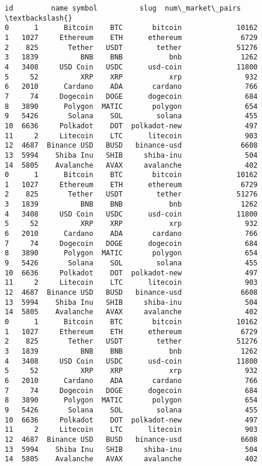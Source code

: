 \documentclass[11pt]{article}
\makeatletter
\newcommand{\boxspacing}{\kern\kvtcb@left@rule\kern\kvtcb@boxsep}
\newcommand{\prompt}[4]{
        {\ttfamily\llap{{\color{#2}[#3]:\hspace{3pt}#4}}\vspace{-\baselineskip}}
    }
\makeatother
\begin{document}
            \begin{tcolorbox}[breakable, size=fbox, boxrule=.5pt, pad at break*=1mm, opacityfill=0]
\prompt{Out}{outcolor}{47}{\boxspacing}
\begin{Verbatim}[commandchars=\\\{\}]
      id         name symbol          slug  num\_market\_pairs  \textbackslash{}
0      1      Bitcoin    BTC       bitcoin             10162
1   1027     Ethereum    ETH      ethereum              6729
2    825       Tether   USDT        tether             51276
3   1839          BNB    BNB           bnb              1262
4   3408     USD Coin   USDC      usd-coin             11800
5     52          XRP    XRP           xrp               932
6   2010      Cardano    ADA       cardano               766
7     74     Dogecoin   DOGE      dogecoin               684
8   3890      Polygon  MATIC       polygon               654
9   5426       Solana    SOL        solana               455
10  6636     Polkadot    DOT  polkadot-new               497
11     2     Litecoin    LTC      litecoin               903
12  4687  Binance USD   BUSD   binance-usd              6608
13  5994    Shiba Inu   SHIB     shiba-inu               504
14  5805    Avalanche   AVAX     avalanche               402
0      1      Bitcoin    BTC       bitcoin             10162
1   1027     Ethereum    ETH      ethereum              6729
2    825       Tether   USDT        tether             51276
3   1839          BNB    BNB           bnb              1262
4   3408     USD Coin   USDC      usd-coin             11800
5     52          XRP    XRP           xrp               932
6   2010      Cardano    ADA       cardano               766
7     74     Dogecoin   DOGE      dogecoin               684
8   3890      Polygon  MATIC       polygon               654
9   5426       Solana    SOL        solana               455
10  6636     Polkadot    DOT  polkadot-new               497
11     2     Litecoin    LTC      litecoin               903
12  4687  Binance USD   BUSD   binance-usd              6608
13  5994    Shiba Inu   SHIB     shiba-inu               504
14  5805    Avalanche   AVAX     avalanche               402
0      1      Bitcoin    BTC       bitcoin             10162
1   1027     Ethereum    ETH      ethereum              6729
2    825       Tether   USDT        tether             51276
3   1839          BNB    BNB           bnb              1262
4   3408     USD Coin   USDC      usd-coin             11800
5     52          XRP    XRP           xrp               932
6   2010      Cardano    ADA       cardano               766
7     74     Dogecoin   DOGE      dogecoin               684
8   3890      Polygon  MATIC       polygon               654
9   5426       Solana    SOL        solana               455
10  6636     Polkadot    DOT  polkadot-new               497
11     2     Litecoin    LTC      litecoin               903
12  4687  Binance USD   BUSD   binance-usd              6608
13  5994    Shiba Inu   SHIB     shiba-inu               504
14  5805    Avalanche   AVAX     avalanche               402


\end{Verbatim}
\end{tcolorbox}
\end{document}
